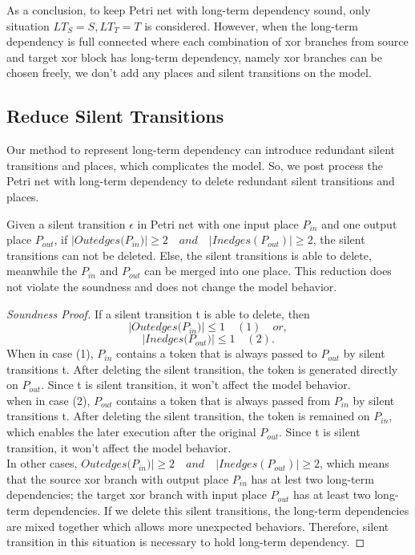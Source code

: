 As a conclusion, to keep Petri net with long-term dependency sound, only situation $ LT_S = S, LT_T=T$ is considered. However, when the long-term dependency is full connected where each combination of xor branches from source and target xor block has long-term dependency, namely xor branches can be chosen freely, we don't add any places and silent transitions on the model. 
\subsection{Reduce Silent Transitions}
Our method to represent long-term dependency can introduce redundant silent transitions and places, which complicates the model. So, we post process the Petri net with long-term dependency to delete redundant silent transitions and places.
\begin{proposition}
	Given a silent transition $\epsilon$ in Petri net with one input place $P_{in}$ and one output place $P_{out}$, if $\vert Outedges({P_{in}) }\vert \geq 2 \quad and \quad \vert Inedges(P_{out}) \vert \geq 2 $, the silent transitions can not be deleted. Else, the silent transitions is able to delete, meanwhile the $P_{in}$ and $P_{out}$ can be merged into one place. This reduction does not violate the soundness and does not change the model behavior.
\end{proposition}
\begin{proof}[Soundness Proof]
	If a silent transition t is able to delete, then
	\[\vert Outedges({P_{in}) }\vert \leq 1	\quad (1) \quad or, \]
	\[\vert Inedges({P_{out}) }\vert \leq 1\quad (2).\]
	When in case (1), $P_{in}$ contains a token that is always passed to $P_{out}$ by silent transitions t. After deleting the silent transition, the token is generated directly on $P_{out}$. Since t is silent transition, it won't affect the model behavior. \\ 
	when in case (2), $P_{out}$ contains a token that is always passed from $P_{in}$ by silent transitions t. After deleting the silent transition, the token is remained on $P_{in}$, which enables the later execution after the original $P_{out}$. Since t is silent transition, it won't affect the model behavior. \\
	In other cases, $Outedges({P_{in}) }\vert \geq 2 \quad and \quad \vert Inedges(P_{out}) \vert \geq 2$, which means that the source xor branch with output place $P_{in}$ has at lest two long-term dependencies; the target xor branch with input place $P_{out}$ has at least two long-term dependencies. If we delete this silent transitions, the long-term dependencies are mixed together which allows more unexpected behaviors. Therefore, silent transition in this situation is necessary to hold long-term dependency.
\end{proof}

